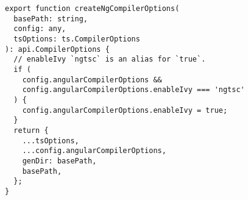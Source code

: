 \begin{verbatim}
export function createNgCompilerOptions(
  basePath: string,
  config: any,
  tsOptions: ts.CompilerOptions
): api.CompilerOptions {
  // enableIvy `ngtsc` is an alias for `true`.
  if (
    config.angularCompilerOptions &&
    config.angularCompilerOptions.enableIvy === 'ngtsc'
  ) {
    config.angularCompilerOptions.enableIvy = true;
  }
  return {
    ...tsOptions,
    ...config.angularCompilerOptions,
    genDir: basePath,
    basePath,
  };
}
\end{verbatim}
